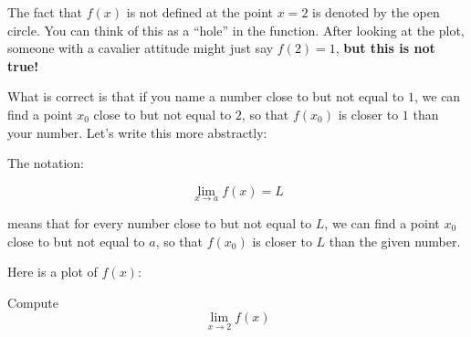 \documentclass{ximera}
\begin{document}
The fact that $f(x)$ is not defined at the point $x=2$ is denoted by
the open circle. You can think of this as a ``hole'' in the
function. After looking at the plot, someone with a cavalier attitude
might just say $f(2) = 1$, \textbf{but this is not true!}

What is correct is that if you name a number close to but not equal to
$1$, we can find a point $x_0$ close to but not equal to $2$, so that
$f(x_0)$ is closer to $1$ than your number. Let's write this more
abstractly:

\begin{definition}
The notation:

\[
\lim_{x\to a} f(x) = L
\]

means that for every number close to but not equal to $L$, we can find
a point $x_0$ close to but not equal to $a$, so that $f(x_0)$ is
closer to $L$ than the given number.
\end{definition}




\begin{question}
Here is a plot of $f(x)$:
\begin{image}
\end{image}

Compute
\[
\lim_{x\to 2} f(x)
\]
\begin{multipleChoice}
\end{multipleChoice}  
\end{question}
\end{document}
